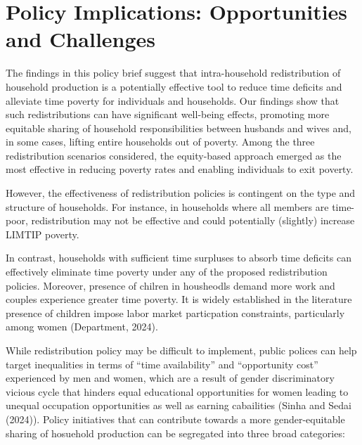 \documentclass[
  11pt,
]{article}
\begin{document}
\section{Policy Implications: Opportunities and
Challenges}\label{policy-implications-opportunities-and-challenges}

The findings in this policy brief suggest that intra-household
redistribution of household production is a potentially effective tool
to reduce time deficits and alleviate time poverty for individuals and
households. Our findings show that such redistributions can have
significant well-being effects, promoting more equitable sharing of
household responsibilities between husbands and wives and, in some
cases, lifting entire households out of poverty. Among the three
redistribution scenarios considered, the equity-based approach emerged
as the most effective in reducing poverty rates and enabling individuals
to exit poverty.

However, the effectiveness of redistribution policies is contingent on
the type and structure of households. For instance, in households where
all members are time-poor, redistribution may not be effective and could
potentially (slightly) increase LIMTIP poverty.

In contrast, households with sufficient time surpluses to absorb time
deficits can effectively eliminate time poverty under any of the
proposed redistribution policies. Moreover, presence of chilren in
housheodls demand more work and couples experience greater time poverty.
It is widely established in the literature presence of children impose
labor market particpation constraints, particularly among women
(Department, 2024).

While redistribution policy may be difficult to implement, public
polices can help target inequalities in terms of ``time availability''
and ``opportunity cost'' experienced by men and women, which are a
result of gender discriminatory vicious cycle that hinders equal
educational opportunities for women leading to unequal occupation
opportunities as well as earning cabailities (Sinha and Sedai (2024)).
Policy initiatives that can contribute towards a more gender-equitable
sharing of hosuehold production can be segregated into three broad
categories:
\end{document}
